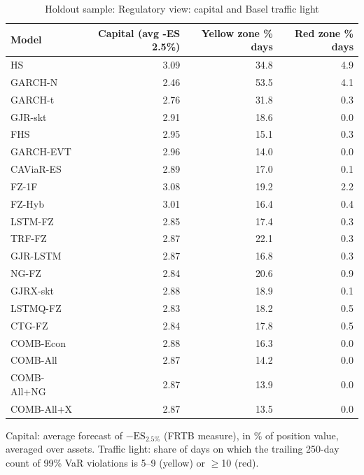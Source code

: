 \begin{table}[htbp]
\centering
\footnotesize
\caption{Holdout sample: Regulatory view: capital and Basel traffic light}
\label{tab:ho_reg}
\begin{tabular}{lrrr}
\toprule
Model & Capital (avg -ES 2.5\%) & Yellow zone \% days & Red zone \% days \\
\midrule
HS & 3.09 & 34.8 & 4.9 \\
GARCH-N & 2.46 & 53.5 & 4.1 \\
GARCH-t & 2.76 & 31.8 & 0.3 \\
GJR-skt & 2.91 & 18.6 & 0.0 \\
FHS & 2.95 & 15.1 & 0.3 \\
GARCH-EVT & 2.96 & 14.0 & 0.0 \\
CAViaR-ES & 2.89 & 17.0 & 0.1 \\
FZ-1F & 3.08 & 19.2 & 2.2 \\
FZ-Hyb & 3.01 & 16.4 & 0.4 \\
LSTM-FZ & 2.85 & 17.4 & 0.3 \\
TRF-FZ & 2.87 & 22.1 & 0.3 \\
GJR-LSTM & 2.87 & 16.8 & 0.3 \\
NG-FZ & 2.84 & 20.6 & 0.9 \\
GJRX-skt & 2.88 & 18.9 & 0.1 \\
LSTMQ-FZ & 2.83 & 18.2 & 0.5 \\
CTG-FZ & 2.84 & 17.8 & 0.5 \\
COMB-Econ & 2.88 & 16.3 & 0.0 \\
COMB-All & 2.87 & 14.2 & 0.0 \\
COMB-All+NG & 2.87 & 13.9 & 0.0 \\
COMB-All+X & 2.87 & 13.5 & 0.0 \\
\bottomrule
\end{tabular}
\par\smallskip\parbox{\linewidth}{\scriptsize Capital: average forecast of $-\mathrm{ES}_{2.5\%}$ (FRTB measure), in \% of position value, averaged over assets. Traffic light: share of days on which the trailing 250-day count of 99\% VaR violations is 5--9 (yellow) or $\geq$10 (red).}
\end{table}
